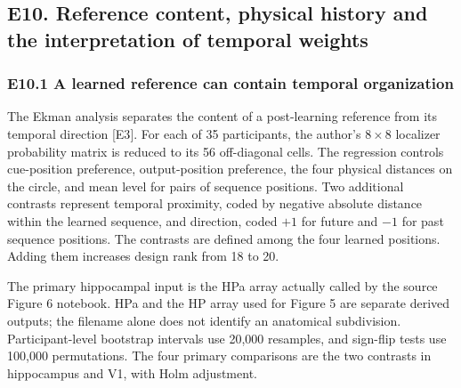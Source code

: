 \documentclass[11pt,a4paper]{article}
\begin{document}
\subsection{E10. Reference content, physical history and the
interpretation of temporal
weights}\label{e10.-reference-content-physical-history-and-the-interpretation-of-temporal-weights}

\subsubsection{E10.1 A learned reference can contain temporal
organization}\label{e10.1-a-learned-reference-can-contain-temporal-organization}

The Ekman analysis separates the content of a post-learning reference
from its temporal direction {[}E3{]}. For each of 35 participants, the
author's \(8\times8\) localizer probability matrix is reduced to its 56
off-diagonal cells. The regression controls cue-position preference,
output-position preference, the four physical distances on the circle,
and mean level for pairs of sequence positions. Two additional contrasts
represent temporal proximity, coded by negative absolute distance within
the learned sequence, and direction, coded \(+1\) for future and \(-1\)
for past sequence positions. The contrasts are defined among the four
learned positions. Adding them increases design rank from 18 to 20.

The primary hippocampal input is the HPa array actually called by the
source Figure 6 notebook. HPa and the HP array used for Figure 5 are
separate derived outputs; the filename alone does not identify an
anatomical subdivision. Participant-level bootstrap intervals use 20,000
resamples, and sign-flip tests use 100,000 permutations. The four
primary comparisons are the two contrasts in hippocampus and V1, with
Holm adjustment.


\begingroup
\small
\end{document}
